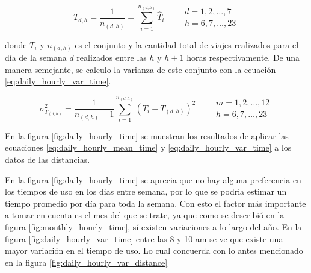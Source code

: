 \begin{equation}
    \bar{T}_{d,h} = \frac{1}{n_{(d,h)}} = \sum_{i=1}^{n_{(d,h)}} \hat{T}_{i} \qquad \begin{matrix}
        d=1,2,\dots,7 \\ h=6,7,\dots,23
    \end{matrix} \label{eq:daily_hourly_mean_time}
\end{equation}

donde $T_i$ y $n_{(d,h)}$ es el conjunto y la cantidad total de viajes realizados para el día de la semana $d$ realizados entre las $h$ y $h+1$ horas respectivamente. De una manera semejante, se calculo la varianza de este conjunto con la ecuación \ref{eq:daily_hourly_var_time}.

\begin{equation}
    \sigma^2_{T_{(d,h)}} = \frac{1}{n_{(d,h)}-1} \sum_{i=1}^{n_{(d,h)}} (T_i-\bar{T}_{(d,h)})^2 \qquad \begin{matrix}
        m=1,2,\dots,12 \\ h=6,7,\dots,23
    \end{matrix} \label{eq:daily_hourly_var_time}
\end{equation}

En la figura \ref{fig:daily_hourly_time} se muestran los resultados de aplicar las ecuaciones \ref{eq:daily_hourly_mean_time} y \ref{eq:daily_hourly_var_time} a los datos de las distancias.

En la figura \ref{fig:daily_hourly_time} se aprecia que no hay alguna preferencia en los tiempos de uso en los dias entre semana, por lo que se podria estimar un tiempo promedio por día para toda la semana. Con esto el factor más importante a tomar en cuenta es el mes del que se trate, ya que como se describió en la figura \ref{fig:monthly_hourly_time}, sí existen variaciones a lo largo del año. En la figura \ref{fig:daily_hourly_var_time} entre las 8 y 10 am se ve que existe una mayor variación en el tiempo de uso. Lo cual concuerda con lo antes mencionado en la figura \ref{fig:daily_hourly_var_distance}

